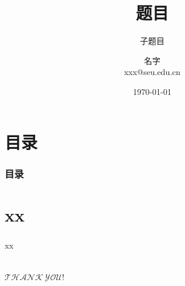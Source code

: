 \documentclass{beamer}
\title[下标]{题目}
\subtitle{子题目}
\author[名字缩写]{名字\\
xxx@seu.edu.cn}
\institute[SEU]
{信息科学与工程学院 \\
	东南大学  \\ \vspace{.3cm}
\centering \texttt{[image: figures/seu-color-logo]}  
}
\date{\today}
\begin{document}
\begin{frame}
\titlepage
\end{frame}

\section*{目录}

\begin{frame}
\frametitle{\textbf{目录}}
\textbf{\tableofcontents}
\end{frame}	



\section{xx} 
\begin{frame}
\frametitle{\textbf{ }}
xx

\end{frame}






\section*{}
\begin{frame}
\Huge \centering $\mathcal{THANK \ 　YOU!}$
\end{frame}
\end{document}

